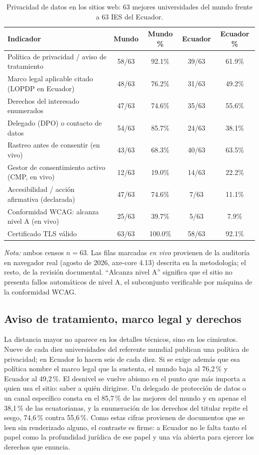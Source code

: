 \documentclass[11pt,a4paper]{article}
\begin{document}
\begin{table}[htbp]
	\centering
	\caption{Privacidad de datos en los sitios web: 63 mejores universidades del mundo frente a 63 IES del Ecuador.}
	\label{tab:comp}
	\small
	\begin{tabular}{@{}p{7.2cm}cccc@{}}
		\toprule
		\textbf{Indicador} & \textbf{Mundo} & \textbf{Mundo \%} & \textbf{Ecuador} & \textbf{Ecuador \%} \\
		\midrule
	Pol\'itica de privacidad / aviso de tratamiento & 58/63 & 92.1\% & 39/63 & 61.9\% \\
	Marco legal aplicable citado (LOPDP en Ecuador) & 48/63 & 76.2\% & 31/63 & 49.2\% \\
	Derechos del interesado enumerados & 47/63 & 74.6\% & 35/63 & 55.6\% \\
	Delegado (DPO) o contacto de datos & 54/63 & 85.7\% & 24/63 & 38.1\% \\
	Rastreo antes de consentir (en vivo) & 43/63 & 68.3\% & 40/63 & 63.5\% \\
	Gestor de consentimiento activo (CMP, en vivo) & 12/63 & 19.0\% & 14/63 & 22.2\% \\
	Accesibilidad / acci\'on afirmativa (declarada) & 47/63 & 74.6\% & 7/63 & 11.1\% \\
	Conformidad WCAG: alcanza nivel A (en vivo) & 25/63 & 39.7\% & 5/63 & 7.9\% \\
	Certificado TLS v\'alido & 63/63 & 100.0\% & 58/63 & 92.1\% \\
		\bottomrule
	\end{tabular}
	\par\vspace{2pt}
	\footnotesize\RaggedRight\textit{Nota:} ambos censos $n=63$. Las filas marcadas \emph{en vivo} provienen de la auditor\'ia en navegador real (agosto de 2026, axe-core 4.13) descrita en la metodolog\'ia; el resto, de la revisi\'on documental. ``Alcanza nivel A'' significa que el sitio no presenta fallos autom\'aticos de nivel A, el subconjunto verificable por m\'aquina de la conformidad WCAG.
\end{table}

\subsection{Aviso de tratamiento, marco legal y derechos}
La distancia mayor no aparece en los detalles técnicos, sino en los cimientos. Nueve de cada diez universidades del referente mundial publican una política de privacidad; en Ecuador lo hacen seis de cada diez. Si se exige además que esa política nombre el marco legal que la sustenta, el mundo baja al 76,2\,\% y Ecuador al 49,2\,\%. El desnivel se vuelve abismo en el punto que más importa a quien usa el sitio: saber a quién dirigirse. Un delegado de protección de datos o un canal específico consta en el 85,7\,\% de las mejores del mundo y en apenas el 38,1\,\% de las ecuatorianas, y la enumeración de los derechos del titular repite el sesgo, 74,6\,\% contra 55,6\,\%. Como estas cifras provienen de documentos que se leen sin renderizado alguno, el contraste es firme: a Ecuador no le falta tanto el papel como la profundidad jurídica de ese papel y una vía abierta para ejercer los derechos que enuncia.
\end{document}
